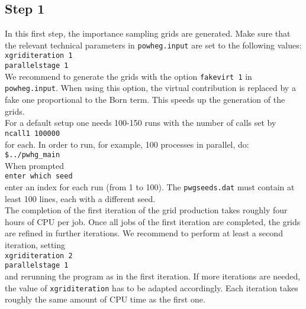 \documentclass[a4paper,11pt]{article}
\begin{document}
\subsection*{Step 1}
%
In this first step, the importance sampling grids are generated. Make sure that the relevant technical parameters in {\tt powheg.input} are set to the following values:
\\[2ex]
{\tt xgriditeration   1}
\\
{\tt parallelstage     1}
\\[2ex]
We recommend to generate the grids with the option {\tt fakevirt 1} in
{\tt powheg.input}. When using this option, the virtual contribution
is replaced by a fake one proportional to the Born term. This speeds
up the generation of the grids.
\\[2ex]
For a default setup one needs 100-150 runs with the number of calls set by
\\[2ex] 
{\tt ncall1 100000}
\\[2ex] 
for each. 
In order to run, for example, 100 processes in parallel, do: 
\\[2ex]
{\tt \$../pwhg\_main}
\\[2ex]
When prompted
\\[2ex]
{\tt enter which seed}
\\[2ex]
enter an index for each run (from 1 to 100). The {\tt pwgseeds.dat}
must contain at least 100 lines, each with a different seed.
\\[2ex]
The completion of the first iteration of the grid production takes
roughly four hours of CPU per job. Once all jobs of the first iteration are completed,  the grids are refined in further iterations. We recommend to perform at least a second iteration, setting 
\\[2ex]
{\tt xgriditeration   2}
\\
{\tt parallelstage     1}
\\[2ex]
%
and rerunning the program as in the first iteration. If more iterations are needed, the value of {\tt xgriditeration} has to be adapted accordingly.  Each iteration takes roughly the same amount of CPU time as the first one. 
 

\end{document}
